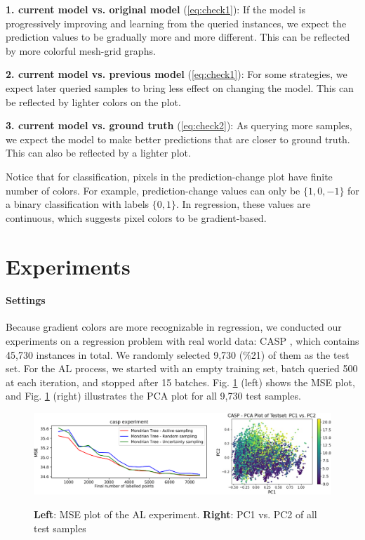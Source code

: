\documentclass{article}
\begin{document}
\textbf{1. current model vs. original model} (\cref{eq:check1}): If the model is progressively improving and learning from the queried instances, we expect the prediction values to be gradually more and more different. This can be reflected by more colorful mesh-grid graphs.

\textbf{2. current model vs. previous model} (\cref{eq:check1}): For some strategies, we expect later queried samples to bring less effect on changing the model. This can be reflected by lighter colors on the plot.

\textbf{3. current model vs. ground truth} (\cref{eq:check2}): As querying more samples, we expect the model to make better predictions that are closer to ground truth. This can also be reflected by a lighter plot.

Notice that for classification, pixels in the prediction-change plot have finite number of colors. For example, prediction-change values can only be $\{1,0,-1 \}$ for a binary classification with labels $\{ 0, 1\}$. In regression, these values are continuous, which suggests pixel colors to be gradient-based.


\section{Experiments}

\paragraph{Settings}

Because gradient colors are more recognizable in regression, we conducted our experiments on a regression problem with real world data: CASP \citep{CASP}, which contains 45,730 instances in total. We randomly selected 9,730 (\%21) of them as the test set. For the AL process, we started with an empty training set, batch queried 500 at each iteration, and stopped after 15 batches. Fig. \ref{fig1} (left) shows the MSE plot, and Fig. \ref{fig1} (right) illustrates the PCA plot for all 9,730 test samples.

\begin{figure}[h]
\centering
 \includegraphics[width=0.94\linewidth]{Figure1.png}
 {
 }
 \caption{\textbf{Left}: MSE plot of the AL experiment. 
          \textbf{Right}: PC1 vs. PC2 of all test samples}
 \centering
 \label{fig1}
\end{figure}
\end{document}
